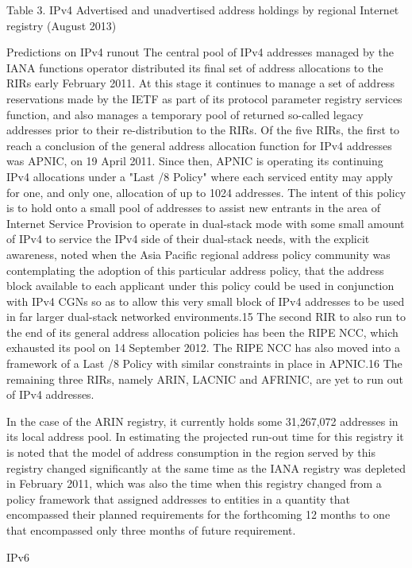 \documentclass[11pt]{report}
\begin{document}
Table 3. IPv4 Advertised and unadvertised address holdings by regional Internet registry (August 2013)

Predictions on IPv4 runout
The central pool of IPv4 addresses managed by the IANA functions operator distributed its final
set of address allocations to the RIRs early February 2011. At this stage it continues to manage a set of
address reservations made by the IETF as part of its protocol parameter registry services function, and also
manages a temporary pool of returned so-called legacy addresses prior to their re-distribution to the RIRs.
Of the five RIRs, the first to reach a conclusion of the general address allocation function for
IPv4 addresses was APNIC, on 19 April 2011. Since then, APNIC is operating its continuing IPv4
allocations under a "Last /8 Policy" where each serviced entity may apply for one, and only one, allocation
of up to 1024 addresses. The intent of this policy is to hold onto a small pool of addresses to assist new
entrants in the area of Internet Service Provision to operate in dual-stack mode with some small amount of
IPv4 to service the IPv4 side of their dual-stack needs, with the explicit awareness, noted when the Asia
Pacific regional address policy community was contemplating the adoption of this particular address
policy, that the address block available to each applicant under this policy could be used in conjunction
with IPv4 CGNs so as to allow this very small block of IPv4 addresses to be used in far larger dual-stack
networked environments.15
The second RIR to also run to the end of its general address allocation policies has been the RIPE
NCC, which exhausted its pool on 14 September 2012. The RIPE NCC has also moved into a framework
of a Last /8 Policy with similar constraints in place in APNIC.16
The remaining three RIRs, namely ARIN, LACNIC and AFRINIC, are yet to run out of IPv4
addresses.

In the case of the ARIN registry, it currently holds some 31,267,072 addresses in its local address
pool. In estimating the projected run-out time for this registry it is noted that the model of address
consumption in the region served by this registry changed significantly at the same time as the IANA
registry was depleted in February 2011, which was also the time when this registry changed from a policy
framework that assigned addresses to entities in a quantity that encompassed their planned requirements
for the forthcoming 12 months to one that encompassed only three months of future requirement.


IPv6
\end{document}
